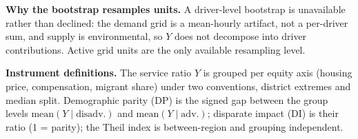 \textbf{Why the bootstrap resamples units.} A driver-level bootstrap is
unavailable rather than declined: the demand grid is a mean-hourly artifact,
not a per-driver sum, and supply is environmental, so $Y$ does not decompose
into driver contributions. Active grid units are the only available
resampling level.

\textbf{Instrument definitions.} The service ratio $Y$ is grouped
per equity axis (housing price, compensation, migrant share) under two
conventions, district extremes and median split. Demographic parity (DP) is
the signed gap between the group levels
$\mathrm{mean}(Y \mid \mathrm{disadv.})$ and
$\mathrm{mean}(Y \mid \mathrm{adv.})$; disparate impact (DI) is their ratio
(1 = parity); the Theil index is between-region and grouping independent.
